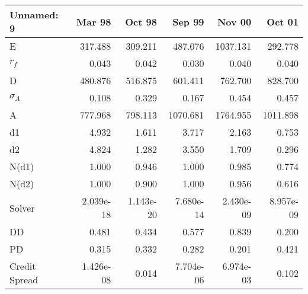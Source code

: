 \begin{tabular}{lrrrrr}
\toprule
    Unnamed: 9 &    Mar 98 &    Oct 98 &    Sep 99 &    Nov 00 &    Oct 01 \\
\midrule
             E &   317.488 &   309.211 &   487.076 &  1037.131 &   292.778 \\
         $r_f$ &     0.043 &     0.042 &     0.030 &     0.040 &     0.040 \\
             D &   480.876 &   516.875 &   601.411 &   762.700 &   828.700 \\
    $\sigma_A$ &     0.108 &     0.329 &     0.167 &     0.454 &     0.457 \\
             A &   777.968 &   798.113 &  1070.681 &  1764.955 &  1011.898 \\
            d1 &     4.932 &     1.611 &     3.717 &     2.163 &     0.753 \\
            d2 &     4.824 &     1.282 &     3.550 &     1.709 &     0.296 \\
         N(d1) &     1.000 &     0.946 &     1.000 &     0.985 &     0.774 \\
         N(d2) &     1.000 &     0.900 &     1.000 &     0.956 &     0.616 \\
        Solver & 2.039e-18 & 1.143e-20 & 7.680e-14 & 2.430e-09 & 8.957e-09 \\
            DD &     0.481 &     0.434 &     0.577 &     0.839 &     0.200 \\
            PD &     0.315 &     0.332 &     0.282 &     0.201 &     0.421 \\
 Credit Spread & 1.426e-08 &     0.014 & 7.704e-06 & 6.974e-03 &     0.102 \\
\bottomrule
\end{tabular}
